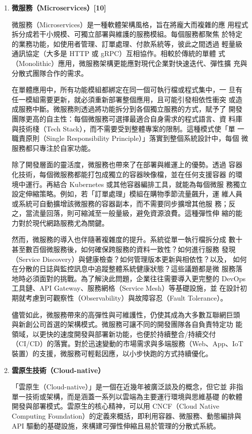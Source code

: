 \documentclass[12pt,a4paper]{article}
\begin{document}
\begin{enumerate}[label={(\zhdig*)}, leftmargin=2\parindent, listparindent=\parindent]
\begin{enumerate}[label={(\arabic*)}, leftmargin=\parindent, listparindent=\parindent]
\item\textbf{微服務（Microservices）[10]}

微服務（Microservices）是一種軟體架構風格，旨在將龐大而複雜的應
用程式拆分成若干小規模、可獨立部署與維護的服務模組。每個服務都聚焦
於特定的業務功能，如使用者管理、訂單處理、付款系統等，彼此之間透過
輕量級通訊協定（大多是 HTTP 或 gRPC）互相協作。相較於傳統的單體
式（Monolithic）應用，微服務架構更能應對現代企業對快速迭代、彈性擴
充與分散式團隊合作的需求。

在單體應用中，所有功能模組都綁定在同一個可執行檔或程式集中，一
旦有任一模組需要更新，就必須重新部署整個應用，且可能引發相依性衝突
或造成服務中斷。微服務則透過將功能拆分到各個獨立服務的方式，賦予了
開發團隊更高的自主性：每個微服務可選擇最適合自身需求的程式語言、資
料庫與技術棧（Tech Stack），而不需要受到整體專案的限制。這種模式使「單
一職責原則（Single Responsibility Principle）」落實到整個系統設計中，每個
微服務都只專注於自家功能。

除了開發層面的靈活度，微服務也帶來了在部署與維運上的優勢。透過
容器化技術，每個微服務都能打包成獨立的容器映像檔，並在任何支援容器
的環境中運行。再結合 Kubernetes 或其他容器編排工具，就能為每個微服
務獨立設定伸縮策略。例如，若「訂單處理」模組在購物季節流量飆升，運
維人員或系統可自動擴增該微服務的容器副本，而不需要同步擴增其他服
務；反之，當流量回落，則可縮減至一般量級，避免資源浪費。這種彈性伸
縮的能力對於現代網路服務尤為關鍵。

然而，微服務的導入也伴隨著複雜度的提升。系統從單一執行檔拆分成
數十甚至數百個微服務後，如何確保跨服務的資料一致性？如何進行服務
發現（Service Discovery）與健康檢查？如何管理版本更新與相依性？以及，
如何在分散的日誌與監控訊息中追蹤整體系統健康狀態？這些議題都是微
服務落地時必須面對的挑戰。為了解決此問題，企業往往需要導入更完整的
DevOps 工具鏈、API Gateway、服務網格（Service Mesh）等基礎設施，並
在設計初期就考慮到可觀察性（Observability）與故障容忍（Fault Tolerance）。

儘管如此，微服務帶來的高彈性與可維護性，仍使其成為大多數互聯網巨頭
與新創公司首選的架構模式。微服務可讓不同的開發團隊各自負責特定功
能領域，以更快的速度開發與部署新功能，也便於持續整合/持續交付
（CI/CD）的落實。對於迅速變動的市場需求與多端服務（Web、App、IoT
裝置）的支援，微服務可輕鬆因應，以小步快跑的方式持續優化。

\item\textbf{雲原生技術（Cloud-native）}

「雲原生（Cloud-native）」是一個在近幾年被廣泛談及的概念，但它並
非指單一技術或架構，而是涵蓋一系列以雲端為主要運行環境與思維基礎
的軟體開發與部署模式。雲原生的核心精神，可以用 CNCF（Cloud Native
Computing Foundation）的定義來概括，即利用容器、微服務、動態編排與
API 驅動的基礎設施，來構建可彈性伸縮且易於管理的分散式系統。


\end{enumerate}
\end{enumerate}
\end{document}

